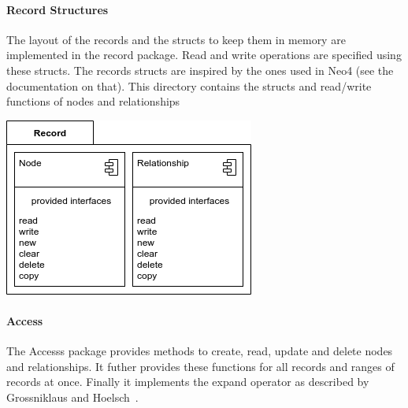     \paragraph{Record Structures}
    The layout of the records and the structs to keep them in memory are implemented in the record package. Read and write operations are specified using these structs. The records structs are inspired by the ones used in Neo4 (see the documentation on that).  
    This directory contains the structs and read/write functions of nodes and relationships \\
    \begin{center}
     \includegraphics[keepaspectratio, width=\textwidth, height=0.2\textheight]{img/record_arch.png} \\
    \end{center}
    \newpage
    
    \paragraph{Access}
        The Accesss package provides methods to create, read, update and delete nodes and relationships. It futher provides these functions for all records and ranges of records at once. Finally it implements the expand operator as described by Grossniklaus and Hoelsch~\autocite{Holsch2016Algeb}.

